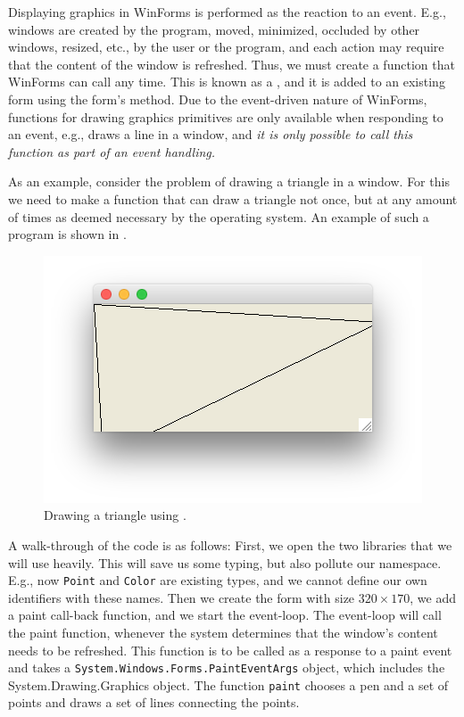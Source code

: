 \documentclass[fsharpNotes.tex]{subfiles}
\begin{document}
Displaying graphics in WinForms is performed as the reaction to an event. E.g., windows are created by the program, moved, minimized, occluded by other windows, resized, etc., by the user or the program, and each action may require that the content of the window is refreshed. Thus, we must create a function that WinForms can call any time. This is known as a , and it is added to an existing form using the form's  method. Due to the event-driven nature of WinForms, functions for drawing graphics primitives are only available when responding to an event, e.g.,  draws a line in a window, and \emph{it is only possible to call this function as part of an event handling.}

As an example, consider the problem of drawing a triangle in a window. For this we need to make a function that can draw a triangle not once, but at any amount of times as deemed necessary by the operating system. An example of such a program is shown in .
%
%
\begin{figure}
  \centering
  \includegraphics[scale=0.3]{triangle}
  \caption{Drawing a triangle using .}
  \label{fig:triangle}
\end{figure}
%
A walk-through of the code is as follows: First, we open the two libraries that we will use heavily. This will save us some typing, but also pollute our namespace. E.g., now \lstinline{Point} and \lstinline{Color} are existing types, and we cannot define our own identifiers with these names. Then we create the form with size $320\times 170$, we add a paint call-back function, and we start the event-loop. The event-loop will call the paint function, whenever the system determines that the window's content needs to be refreshed. This function is to be called as a response to a paint event and takes a \lstinline!System.Windows.Forms.PaintEventArgs! object, which includes the System.Drawing.Graphics object. The function \lstinline{paint} chooses a pen and a set of points and draws a set of lines connecting the points.
\end{document}
